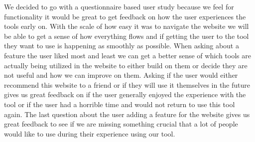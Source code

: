 \documentclass[draftclsnofoot,10pt,onecolumn]{IEEEtran} %
\begin{document}
\begin{enumerate}[label*=\arabic*.]
We decided to go with a questionnaire based user study because we feel for functionality it would be great to get feedback on how the user
experiences the tools early on. With the scale of how easy it was to navigate
the website we will be able to get a sense of how everything flows and if
getting the user to the tool they want to use is happening as smoothly as
possible. When asking about a feature the user liked most and least we can get a
better sense of which tools are actually being utilized in the website to either
build on them or decide they are not useful and how we can improve on them.
Asking if the user would either recommend this website to a friend or if they
will use it themselves in the future gives us great feedback on if the user
generally enjoyed the experience with the tool or if the user had a horrible
time and would not return to use this tool again. The last question about the
user adding a feature for the website gives us great feedback to see if we are
missing something crucial that a lot of people would like to use during their
experience using our tool.
\end{enumerate}
\end{document}
